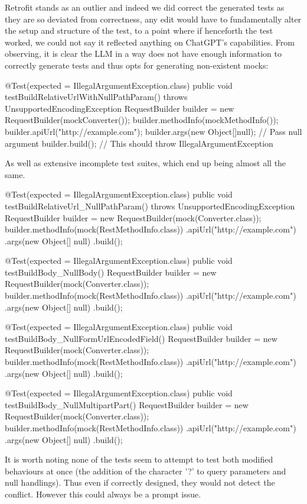 Retrofit stands as an outlier and indeed we did correct the generated tests as they are so deviated from correctness, any edit would have to fundamentally alter the setup and structure of the test,
to a point where if henceforth the test worked, we could not say it reflected anything on ChatGPT's capabilities.
From observing, it is clear the LLM in a way does not have enough information to correctly generate tests and thus opts for generating non-existent mocks:
\begin{response}
@Test(expected = IllegalArgumentException.class)
public void testBuildRelativeUrlWithNullPathParam() throws UnsupportedEncodingException {
    RequestBuilder builder = new RequestBuilder(mockConverter());
    builder.methodInfo(mockMethodInfo());
    builder.apiUrl("http://example.com");
    builder.args(new Object[]{null}); // Pass null argument
    builder.build(); // This should throw IllegalArgumentException
}
\end{response}
As well as extensive incomplete test suites, which end up being almost all the same.
\begin{response}
@Test(expected = IllegalArgumentException.class)
public void testBuildRelativeUrl_NullPathParam() throws UnsupportedEncodingException {
    RequestBuilder builder = new RequestBuilder(mock(Converter.class));
    builder.methodInfo(mock(RestMethodInfo.class))
           .apiUrl("http://example.com")
           .args(new Object[] {null})
           .build();
}

@Test(expected = IllegalArgumentException.class)
public void testBuildBody_NullBody() {
    RequestBuilder builder = new RequestBuilder(mock(Converter.class));
    builder.methodInfo(mock(RestMethodInfo.class))
           .apiUrl("http://example.com")
           .args(new Object[] {null})
           .build();
}

@Test(expected = IllegalArgumentException.class)
public void testBuildBody_NullFormUrlEncodedField() {
    RequestBuilder builder = new RequestBuilder(mock(Converter.class));
    builder.methodInfo(mock(RestMethodInfo.class))
           .apiUrl("http://example.com")
           .args(new Object[] {null})
           .build();
}

@Test(expected = IllegalArgumentException.class)
public void testBuildBody_NullMultipartPart() {
    RequestBuilder builder = new RequestBuilder(mock(Converter.class));
    builder.methodInfo(mock(RestMethodInfo.class))
           .apiUrl("http://example.com")
           .args(new Object[] {null})
           .build();
}
\end{response}
It is worth noting none of the tests seem to attempt to test both modified behaviours at once (the addition of the character '?' to query parameters and null handlings). Thus even if correctly designed, they would not detect the conflict.
However this could always be a prompt issue.

